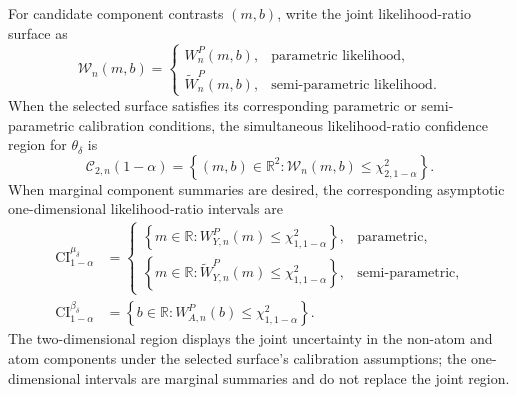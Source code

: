 \documentclass[11pt]{article}
\begin{document}
For candidate component contrasts $(m,b)$, write the joint likelihood-ratio surface as
\begin{equation}
  \mathcal{W}_n(m,b)
  =
  \begin{cases}
    W_n^P(m,b), & \text{parametric likelihood},\\[0.4em]
    \widetilde{W}_n^P(m,b), & \text{semi-parametric likelihood}.
  \end{cases}
  \label{eq:generic-lr-surface}
\end{equation}
When the selected surface satisfies its corresponding parametric or semi-parametric calibration conditions, the simultaneous likelihood-ratio confidence region for $\theta_\delta$ is
\begin{equation}
  \mathcal{C}_{2,n}(1-\alpha)
  =
  \left\{
    (m,b)\in\mathbb{R}^2:
    \mathcal{W}_n(m,b)\leq\chi^2_{2,1-\alpha}
  \right\}.
  \label{eq:component-simultaneous-region}
\end{equation}
When marginal component summaries are desired, the corresponding asymptotic one-dimensional likelihood-ratio intervals are
\begin{align*}
  \mathrm{CI}^{\mu_\delta}_{1-\alpha}
  &=
  \begin{cases}
    \left\{m\in\mathbb{R}:W_{Y,n}^P(m)\leq\chi^2_{1,1-\alpha}\right\},
      & \text{parametric},\\[0.4em]
    \left\{m\in\mathbb{R}:\widetilde{W}_{Y,n}^P(m)\leq\chi^2_{1,1-\alpha}\right\},
      & \text{semi-parametric},
  \end{cases}\\
  \mathrm{CI}^{\beta_\delta}_{1-\alpha}
  &=
  \left\{b\in\mathbb{R}:W_{A,n}^P(b)\leq\chi^2_{1,1-\alpha}\right\}.
\end{align*}
The two-dimensional region displays the joint uncertainty in the non-atom and atom components under the selected surface's calibration assumptions; the one-dimensional intervals are marginal summaries and do not replace the joint region.
\end{document}
